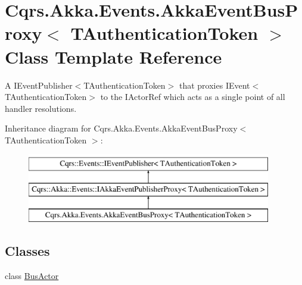 \hypertarget{classCqrs_1_1Akka_1_1Events_1_1AkkaEventBusProxy}{}\section{Cqrs.\+Akka.\+Events.\+Akka\+Event\+Bus\+Proxy$<$ T\+Authentication\+Token $>$ Class Template Reference}
\label{classCqrs_1_1Akka_1_1Events_1_1AkkaEventBusProxy}


A I\+Event\+Publisher$<$\+T\+Authentication\+Token$>$ that proxies I\+Event$<$\+T\+Authentication\+Token$>$ to the I\+Actor\+Ref which acts as a single point of all handler resolutions.  


Inheritance diagram for Cqrs.\+Akka.\+Events.\+Akka\+Event\+Bus\+Proxy$<$ T\+Authentication\+Token $>$\+:\begin{figure}[H]
\begin{center}
\leavevmode
\includegraphics[height=3.000000cm]{classCqrs_1_1Akka_1_1Events_1_1AkkaEventBusProxy}
\end{center}
\end{figure}
\subsection*{Classes}
\begin{DoxyCompactItemize}
\item 
class \hyperlink{classCqrs_1_1Akka_1_1Events_1_1AkkaEventBusProxy_1_1BusActor}{Bus\+Actor}
\end{DoxyCompactItemize}

